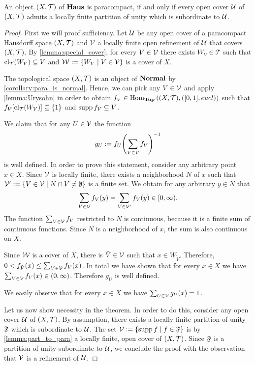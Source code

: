 \begin{theorem}\label{theorem:para_part}
	An object $\tspace$ of $\Haus$ is paracompact, if and only if every open cover $\cover$ of $\tspace$ admits a locally finite partition of unity which is subordinate to $\cover$.  
\end{theorem}
\begin{proof}
	First we will proof sufficiency. Let $\cover$ be any open cover of a paracompact Hausdorff space $\tspace$ and $\cover[V]$ a locally finite open refinement of $\cover$ that covers $\tspace$. By \ref{lemma:special_cover}, for every $V \in \cover[V]$ there exists $W_V \in \mathcal{T}$ such that $\cl{W_V} \subseteq V$ and $\cover[W] := \Bbraces{W_V \mid V \in \cover[V]}$ is a cover of $X$. 
	
	The topological space $\tspace$ is an object of $\Normal$ by \ref{corollary:para_is_normal}. Hence, we can pick any $V \in \cover[V]$ and apply \ref{lemma:Urysohn} in order to obtain $f_V \in \Hom_\Top\pbraces{\tspace, \pbraces{[0,1], \eucl}}$ such that $f_V\bbraces{\cl{W_V}} \subseteq \{1\}$ and $\supp f_V \subseteq V$.
	
	We claim that for any $U \in \cover[V]$ the function
	\begin{align*}
		g_U := f_U \pbraces{\sum_{V \in \cover[V]} f_V}^{-1}
	\end{align*}
	is well defined. In order to prove this statement, consider any arbitrary point $x \in X$.  Since $\cover[V]$ is locally finite, there exists a neighborhood $N$ of $x$ such that $\cover[V]^\prime := \Bbraces{V \in \cover[V] \mid N \cap V \neq \emptyset}$ is a finite set.  We obtain for any arbitrary $y \in N$ that
	\begin{align*}
		\sum_{V \in \cover[V]} f_V(y) = \sum_{V \in \cover[V]^\prime} f_V(y) \in [0, \infty).
	\end{align*}
	The function $\sum_{V \in \cover[V]} f_V$ restricted to $N$ is continuous, because it is a finite sum of continuous functions. Since $N$ is a neighborhood of $x$, the sum is also continuous on $X$.
	
	Since $\cover[W]$ is a cover of $X$, there is $\tilde{V} \in \cover[V]$ such that $x \in W_{\tilde{V}}$. Therefore, $0 < f_{\tilde{V}}(x) \leq \sum_{V \in \cover[V]} f_V(x)$. In total we have shown that for every $x \in X$ we have $\sum_{V \in \cover[V]} f_V(x) \in (0, \infty)$. Therefore $g_U$ is well defined.
	
	We easily observe that for every $x \in X$ we have $\sum_{U \in \cover[V]} g_U(x) = 1$. 
	
	Let us now show necessity in the theorem. In order to do this, consider any open cover $\cover$ of $\tspace$. By assumption, there exists a locally finite partition of unity $\partition$ which is subordinate to $\cover$. The set $\cover[V] := \Bbraces{\supp f \mid f \in \partition}$ is by \ref{lemma:part_to_para} a locally finite, open cover of $\tspace$. Since $\partition$ is a partition of unity subordinate to $\cover$, we conclude the proof with the observation that $\cover[V]$ is a refinement of $\cover$. 
\end{proof}
